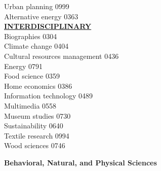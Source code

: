\documentclass[9pt]{article}
\newcommand{\categoryheading}[1]{{\fontsize{8}{11}\selectfont \textbf{\uline{#1}}}}
\newcommand{\fieldheading}[1]{{\large \textbf{#1}}}
\begin{document}
\begin{multicols}{3}
Urban planning \hfill 0999 \leavevmode \\
Alternative energy \hfill 0363 \leavevmode \\
\columnbreak
\categoryheading{INTERDISCIPLINARY} \leavevmode \\
Biographies \hfill 0304 \leavevmode \\
Climate change \hfill 0404 \leavevmode \\
Cultural resources management \hfill 0436 \leavevmode \\
Energy \hfill 0791 \leavevmode \\
Food science \hfill 0359 \leavevmode \\
Home economics \hfill 0386 \leavevmode \\
Information technology \hfill 0489 \leavevmode \\
Multimedia \hfill 0558 \leavevmode \\
Museum studies \hfill 0730 \leavevmode \\
Sustainability \hfill 0640 \leavevmode \\
Textile research \hfill 0994 \leavevmode \\
Wood sciences \hfill 0746 \leavevmode \\
\end{multicols}
\clearpage
\fieldheading{Behavioral, Natural, and Physical Sciences}
\end{document}
